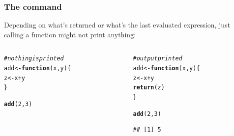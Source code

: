 \documentclass[12pt]{beamer}\usepackage[]{graphicx}\usepackage[]{color}
\makeatletter
\newcommand{\hlnum}[1]{\textcolor[rgb]{0.686,0.059,0.569}{#1}}%
\newcommand{\hlcom}[1]{\textcolor[rgb]{0.678,0.584,0.686}{\textit{#1}}}%
\newcommand{\hlopt}[1]{\textcolor[rgb]{0,0,0}{#1}}%
\newcommand{\hlstd}[1]{\textcolor[rgb]{0.345,0.345,0.345}{#1}}%
\newcommand{\hlkwa}[1]{\textcolor[rgb]{0.161,0.373,0.58}{\textbf{#1}}}%
\newcommand{\hlkwb}[1]{\textcolor[rgb]{0.69,0.353,0.396}{#1}}%
\newcommand{\hlkwc}[1]{\textcolor[rgb]{0.333,0.667,0.333}{#1}}%
\newcommand{\hlkwd}[1]{\textcolor[rgb]{0.737,0.353,0.396}{\textbf{#1}}}%
\newenvironment{kframe}{%
 \def\at@end@of@kframe{}%
 \ifinner\ifhmode%
  \def\at@end@of@kframe{\end{minipage}}%
  \begin{minipage}{\columnwidth}%
 \fi\fi%
 \def\FrameCommand##1{\hskip\@totalleftmargin \hskip-\fboxsep
 \colorbox{shadecolor}{##1}\hskip-\fboxsep
     \hskip-\linewidth \hskip-\@totalleftmargin \hskip\columnwidth}%
 \MakeFramed {\advance\hsize-\width
   \@totalleftmargin\z@ \linewidth\hsize
   \@setminipage}}%
 {\par\unskip\endMakeFramed%
 \at@end@of@kframe}
\newenvironment{knitrout}{}{} %
\makeatother
\begin{document}
\begin{frame}[fragile]
\frametitle{The  command}

Depending on what's returned or what's the last evaluated expression, just calling a function might not print anything:

\begin{columns}[t]
\begin{column}{0.45\textwidth}
\begin{knitrout}\footnotesize
{}\color{fgcolor}\begin{kframe}
\begin{alltt}
\hlcom{# nothing is printed}
\hlstd{add} \hlkwb{<-} \hlkwa{function}\hlstd{(}\hlkwc{x}\hlstd{,} \hlkwc{y}\hlstd{) \{}
  \hlstd{z} \hlkwb{<-} \hlstd{x} \hlopt{+} \hlstd{y}
\hlstd{\}}

\hlkwd{add}\hlstd{(}\hlnum{2}\hlstd{,} \hlnum{3}\hlstd{)}
\end{alltt}
\end{kframe}
\end{knitrout}
\end{column}

\begin{column}{0.45\textwidth}
\begin{knitrout}\footnotesize
{}\color{fgcolor}\begin{kframe}
\begin{alltt}
\hlcom{# output printed}
\hlstd{add} \hlkwb{<-} \hlkwa{function}\hlstd{(}\hlkwc{x}\hlstd{,} \hlkwc{y}\hlstd{) \{}
  \hlstd{z} \hlkwb{<-} \hlstd{x} \hlopt{+} \hlstd{y}
  \hlkwd{return}\hlstd{(z)}
\hlstd{\}}

\hlkwd{add}\hlstd{(}\hlnum{2}\hlstd{,} \hlnum{3}\hlstd{)}
\end{alltt}
\begin{verbatim}
## [1] 5
\end{verbatim}
\end{kframe}
\end{knitrout}
\end{column}
\end{columns}

\end{frame}

\end{document}
